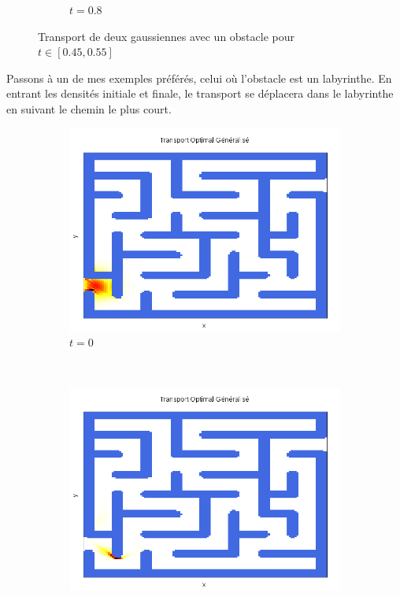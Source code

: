 \documentclass[a4paper,12pt]{article}
\begin{document}
\begin{figure}[!h]
\begin{subfigure}[b]{0.18\linewidth}
\caption{$t=0.8$}
\end{subfigure}

\caption{Transport de deux gaussiennes avec un obstacle pour $t\in[0.45,0.55]$}
\end{figure}

Passons à un de mes exemples préférés, celui où l'obstacle est un labyrinthe. En entrant les densités initiale et finale, le transport se déplacera dans le labyrinthe en suivant le chemin le plus court. 

\begin{figure}[!h]
\centering
\begin{subfigure}[b]{0.23\linewidth}
\includegraphics[width=\linewidth]{img/2DLabyrinthe/T_00001.png}
\caption*{$t=0$}
\end{subfigure}
~
\begin{subfigure}[b]{0.23\linewidth}
\includegraphics[width=\linewidth]{img/2DLabyrinthe/T_00006.png}

\end{subfigure}
\end{figure}
\end{document}
